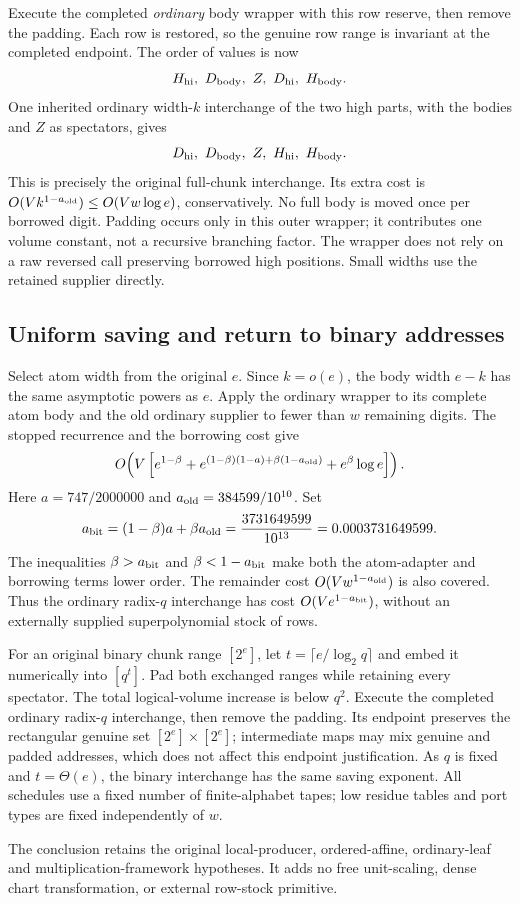Execute the completed \emph{ordinary} body wrapper with this row reserve,
then remove the padding. Each row is restored, so the genuine row range
is invariant at the completed endpoint. The order of values is now
\[
 H_{\rm hi},\ D_{\rm body},\ Z,\ D_{\rm hi},\ H_{\rm body}.
\]
One inherited ordinary width-$k$ interchange of the two high parts,
with the bodies and $Z$ as spectators, gives
\[
 D_{\rm hi},\ D_{\rm body},\ Z,\ H_{\rm hi},\ H_{\rm body}.
\]
This is precisely the original full-chunk interchange. Its extra cost is
$O(Vk^{1-a_{\rm old}})\le O(Vw\log e)$, conservatively. No full body is
moved once per borrowed digit. Padding occurs only in this outer wrapper;
it contributes one volume constant, not a recursive branching factor.
The wrapper does not rely on a raw reversed call preserving borrowed high
positions. Small widths use the retained supplier directly.

\subsection{Uniform saving and return to binary addresses}
Select atom width from the original $e$. Since $k=o(e)$, the body width
$e-k$ has the same asymptotic powers as $e$. Apply the ordinary wrapper to
its complete atom body and the old ordinary supplier to fewer than $w$
remaining digits. The stopped recurrence and the borrowing cost give
\[
 O\!\left(V\left[e^{1-\beta}+
 e^{(1-\beta)(1-a)+\beta(1-a_{\rm old})}+e^\beta\log e\right]\right).
\]
Here $a=747/2000000$ and $a_{\rm old}=384599/10^{10}$. Set
\[
 a_{\rm bit}=(1-\beta)a+\beta a_{\rm old}
 =\frac{3731649599}{10^{13}}=0.0003731649599.
\]
The inequalities $\beta>a_{\rm bit}$ and $\beta<1-a_{\rm bit}$ make both
the atom-adapter and borrowing terms lower order. The remainder cost
$O(Vw^{1-a_{\rm old}})$ is also covered. Thus the ordinary radix-$q$
interchange has cost $O(Ve^{1-a_{\rm bit}})$, without an externally supplied
superpolynomial stock of rows.

For an original binary chunk range $[2^e]$, let
$t=\lceil e/\log_2q\rceil$ and embed it numerically into $[q^t]$.
Pad both exchanged ranges while retaining every spectator. The total
logical-volume increase is below $q^2$. Execute the completed ordinary
radix-$q$ interchange, then remove the padding. Its endpoint preserves the
rectangular genuine set $[2^e]\times[2^e]$; intermediate maps may mix genuine
and padded addresses, which does not affect this endpoint justification.
As $q$ is fixed and $t=\Theta(e)$, the binary interchange has the same
saving exponent. All schedules use a fixed number of finite-alphabet
tapes; low residue tables and port types are fixed independently of $w$.

The conclusion retains the original local-producer, ordered-affine,
ordinary-leaf and multiplication-framework hypotheses. It adds no free
unit-scaling, dense chart transformation, or external row-stock primitive.
